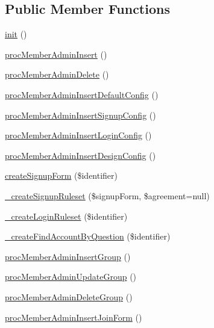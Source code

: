 \subsection*{Public Member Functions}
\begin{DoxyCompactItemize}
\item 
\hyperlink{classmemberAdminController_a6c8b7afa8a1e9de99069b819d30d4f4f}{init} ()
\item 
\hyperlink{classmemberAdminController_a1e89340738ee22bd5af9de8521076aa0}{proc\-Member\-Admin\-Insert} ()
\item 
\hyperlink{classmemberAdminController_abbab5de7009e650ce1ca96d335e9b7be}{proc\-Member\-Admin\-Delete} ()
\item 
\hyperlink{classmemberAdminController_aed6b9a31f228437805b53841455ebeed}{proc\-Member\-Admin\-Insert\-Default\-Config} ()
\item 
\hyperlink{classmemberAdminController_a9e134d115f4fa383b20ec2b7c8cae444}{proc\-Member\-Admin\-Insert\-Signup\-Config} ()
\item 
\hyperlink{classmemberAdminController_a8145cf05118cd5728eb93066efce3fa8}{proc\-Member\-Admin\-Insert\-Login\-Config} ()
\item 
\hyperlink{classmemberAdminController_a95ca46d0090220adba228592e8e09aa5}{proc\-Member\-Admin\-Insert\-Design\-Config} ()
\item 
\hyperlink{classmemberAdminController_a5169e7a00b203b65f8be3efb491937a1}{create\-Signup\-Form} (\$identifier)
\item 
\hyperlink{classmemberAdminController_ae032ea2bb44c28bfa7e04a4d5e357040}{\-\_\-create\-Signup\-Ruleset} (\$signup\-Form, \$agreement=null)
\item 
\hyperlink{classmemberAdminController_ad9823f9a79e8a26a39d912bcd888e301}{\-\_\-create\-Login\-Ruleset} (\$identifier)
\item 
\hyperlink{classmemberAdminController_a6e227f85ce71ac94e57e37ecc395613f}{\-\_\-create\-Find\-Account\-By\-Question} (\$identifier)
\item 
\hyperlink{classmemberAdminController_a3ae8c66d424cd909998fbcd9f257c809}{proc\-Member\-Admin\-Insert\-Group} ()
\item 
\hyperlink{classmemberAdminController_a8d14fe0f7df63dbce5cc50d61d452635}{proc\-Member\-Admin\-Update\-Group} ()
\item 
\hyperlink{classmemberAdminController_a8ee81f4eedf5dc094b5a21a9a1200849}{proc\-Member\-Admin\-Delete\-Group} ()
\item 
\hyperlink{classmemberAdminController_a6b1e886dc7e03b2bd91be9f79c9813ad}{proc\-Member\-Admin\-Insert\-Join\-Form} ()

\end{DoxyCompactItemize}
